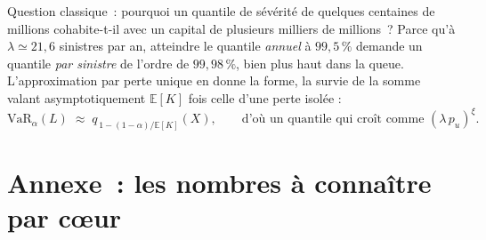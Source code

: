 Question classique~: pourquoi un quantile de sévérité de quelques centaines de millions
cohabite-t-il avec un capital de plusieurs milliers de millions~? Parce qu'à $\lambda\simeq21{,}6$
sinistres par an, atteindre le quantile \emph{annuel} à $99{,}5\,\%$ demande un quantile \emph{par
sinistre} de l'ordre de $99{,}98\,\%$, bien plus haut dans la queue. L'approximation par perte
unique en donne la forme, la survie de la somme valant asymptotiquement $\mathbb E[K]$ fois celle
d'une perte isolée :
\[
\mathrm{VaR}_\alpha(L)\;\approx\;q_{\,1-(1-\alpha)/\mathbb E[K]}(X),
\qquad\text{d'où un quantile qui croît comme } (\lambda\,p_u)^{\xi}.
\]

\newpage
\section*{Annexe~: les nombres à connaître par c\oe ur}

